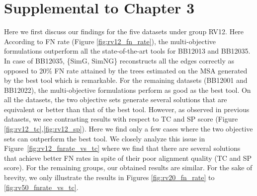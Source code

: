 \section{Supplemental to Chapter 3}
\label{sec:result_balibase}




Here we first discuss our findings for the five datasets under group RV12. Here According to FN rate (Figure \ref{fig:rv12_fn_rate}), the multi-objective formulations outperform all the state-of-the-art tools for BB12013 and BB12035. In case of BB12035, \{SimG, SimNG\} reconstructs all the edges correctly as opposed to 20\% FN rate attained by the trees estimated on the MSA generated by the best tool which is remarkable.
For the remaining datasets (BB12001 and BB12022), the multi-objective formulations perform as good as the best tool. On all the datasets, the two objective sets generate several solutions that are equivalent or better than that of the best tool.
However, as observed in previous datasets, we see contrasting results with respect to TC and SP score (Figure \ref{fig:rv12_tc},\ref{fig:rv12_sp}). Here we find only a few cases where the two objective sets can outperform the best tool. We closely analyze this issue in Figure~\ref{fig:rv12_fnrate_vs_tc} where we find that there are several solutions that achieve better FN rates in spite of their poor alignment quality (TC and SP score). For the remaining groups, our obtained results are similar. For the sake of brevity, we only illustrate the results in Figures \ref{fig:rv20_fn_rate} to \ref{fig:rv50_fnrate_vs_tc}.
